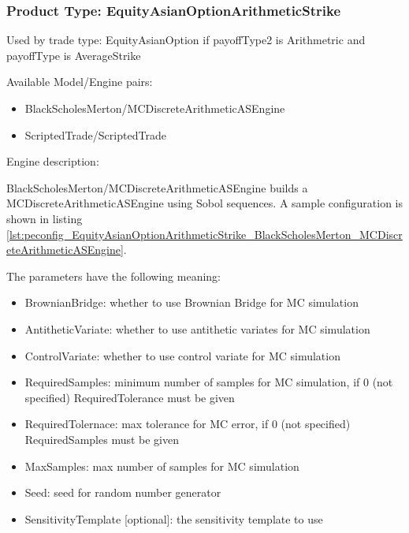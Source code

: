 \subsubsection{Product Type: EquityAsianOptionArithmeticStrike}

Used by trade type: EquityAsianOption if payoffType2 is Arithmetric and payoffType is AverageStrike

Available Model/Engine pairs:

\begin{itemize}
\item BlackScholesMerton/MCDiscreteArithmeticASEngine
\item ScriptedTrade/ScriptedTrade
\end{itemize}
  
Engine description:

BlackScholesMerton/MCDiscreteArithmeticASEngine builds a MCDiscreteArithmeticASEngine using Sobol sequences. A sample
configuration is shown in listing
\ref{lst:peconfig_EquityAsianOptionArithmeticStrike_BlackScholesMerton_MCDiscreteArithmeticASEngine}.

The parameters have the following meaning:

\begin{itemize}
\item BrownianBridge: whether to use Brownian Bridge for MC simulation
\item AntitheticVariate: whether to use antithetic variates for MC simulation
\item ControlVariate: whether to use control variate for MC simulation
\item RequiredSamples: minimum number of samples for MC simulation, if 0 (not specified) RequiredTolerance must be given
\item RequiredTolernace: max tolerance for MC error, if 0 (not specified) RequiredSamples must be given
\item MaxSamples: max number of samples for MC simulation
\item Seed: seed for random number generator
\item SensitivityTemplate [optional]: the sensitivity template to use 
\end{itemize}


